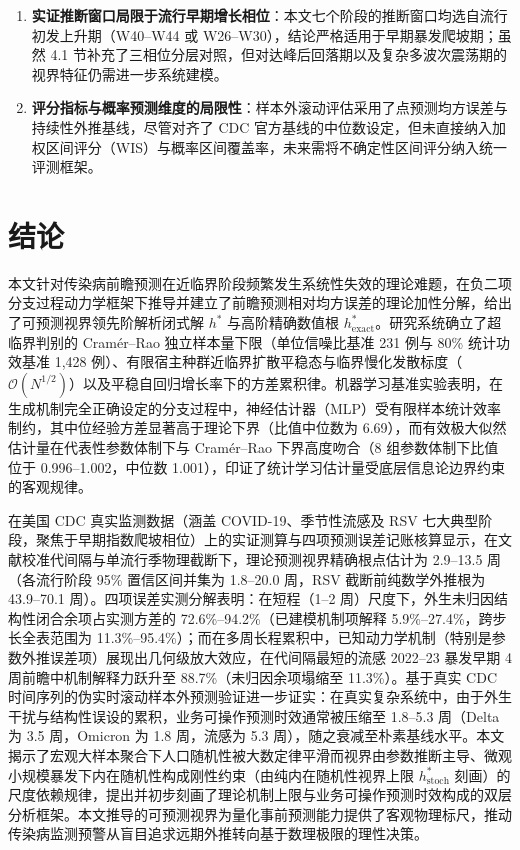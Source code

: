 \documentclass[11pt,a4paper]{article}
\theoremstyle{plain}
\theoremstyle{definition}
\begin{document}
\begin{enumerate}
\item \textbf{实证推断窗口局限于流行早期增长相位}：本文七个阶段的推断窗口均选自流行初发上升期（W40--W44 或 W26--W30），结论严格适用于早期暴发爬坡期；虽然 4.1 节补充了三相位分层对照，但对达峰后回落期以及复杂多波次震荡期的视界特征仍需进一步系统建模。
\item \textbf{评分指标与概率预测维度的局限性}：样本外滚动评估采用了点预测均方误差与持续性外推基线，尽管对齐了 CDC 官方基线的中位数设定，但未直接纳入加权区间评分（WIS）与概率区间覆盖率，未来需将不确定性区间评分纳入统一评测框架。
\end{enumerate}

\section{结论}

本文针对传染病前瞻预测在近临界阶段频繁发生系统性失效的理论难题，在负二项分支过程动力学框架下推导并建立了前瞻预测相对均方误差的理论加性分解，给出了可预测视界领先阶解析闭式解 $h^*$ 与高阶精确数值根 $h^*_{\text{exact}}$。研究系统确立了超临界判别的 Cram\'er--Rao 独立样本量下限（单位信噪比基准 231 例与 80\% 统计功效基准 1,428 例）、有限宿主种群近临界扩散平稳态与临界慢化发散标度（$\mathcal{O}(N^{1/2})$）以及平稳自回归增长率下的方差累积律。机器学习基准实验表明，在生成机制完全正确设定的分支过程中，神经估计器（MLP）受有限样本统计效率制约，其中位经验方差显著高于理论下界（比值中位数为 6.69），而有效极大似然估计量在代表性参数体制下与 Cram\'er--Rao 下界高度吻合（8 组参数体制下比值位于 0.996--1.002，中位数 1.001），印证了统计学习估计量受底层信息论边界约束的客观规律。

在美国 CDC 真实监测数据（涵盖 COVID-19、季节性流感及 RSV 七大典型阶段，聚焦于早期指数爬坡相位）上的实证测算与四项预测误差记账核算显示，在文献校准代间隔与单流行季物理截断下，理论预测视界精确根点估计为 2.9--13.5 周（各流行阶段 95\% 置信区间并集为 1.8--20.0 周，RSV 截断前纯数学外推根为 43.9--70.1 周）。四项误差实测分解表明：在短程（1--2 周）尺度下，外生未归因结构性闭合余项占实测方差的 72.6\%--94.2\%（已建模机制项解释 5.9\%--27.4\%，跨步长全表范围为 11.3\%--95.4\%）；而在多周长程累积中，已知动力学机制（特别是参数外推误差项）展现出几何级放大效应，在代间隔最短的流感 2022--23 暴发早期 4 周前瞻中机制解释力跃升至 88.7\%（未归因余项塌缩至 11.3\%）。基于真实 CDC 时间序列的伪实时滚动样本外预测验证进一步证实：在真实复杂系统中，由于外生干扰与结构性误设的累积，业务可操作预测时效通常被压缩至 1.8--5.3 周（Delta 为 3.5 周，Omicron 为 1.8 周，流感为 5.3 周），随之衰减至朴素基线水平。本文揭示了宏观大样本聚合下人口随机性被大数定律平滑而视界由参数推断主导、微观小规模暴发下内在随机性构成刚性约束（由纯内在随机性视界上限 $h^*_{\text{stoch}}$ 刻画）的尺度依赖规律，提出并初步刻画了理论机制上限与业务可操作预测时效构成的双层分析框架。本文推导的可预测视界为量化事前预测能力提供了客观物理标尺，推动传染病监测预警从盲目追求远期外推转向基于数理极限的理性决策。
\end{document}
